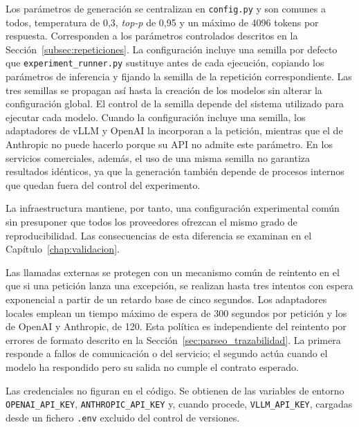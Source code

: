 Los parámetros de generación se centralizan en \texttt{config.py} y son comunes a todos, temperatura de 0,3, \textit{top-p} de 0,95 y un máximo de 4096 tokens por respuesta. Corresponden a los parámetros controlados descritos en la Sección~\ref{subsec:repeticiones}. La configuración incluye una semilla por defecto que \texttt{experiment\_runner.py} sustituye antes de cada ejecución, copiando los parámetros de inferencia y fijando la semilla de la repetición correspondiente. Las tres semillas se propagan así hasta la creación de los modelos sin alterar la configuración global. El control de la semilla depende del sistema utilizado para ejecutar cada modelo. Cuando la configuración incluye una semilla, los adaptadores de vLLM y OpenAI la incorporan a la petición, mientras que el de Anthropic no puede hacerlo porque su API no admite este parámetro. En los servicios comerciales, además, el uso de una misma semilla no garantiza resultados idénticos, ya que la generación también depende de procesos internos que quedan fuera del control del experimento.

La infraestructura mantiene, por tanto, una configuración experimental común sin presuponer que todos los proveedores ofrezcan el mismo grado de reproducibilidad. Las consecuencias de esta diferencia se examinan en el Capítulo~\ref{chap:validacion}.

Las llamadas externas se protegen con un mecanismo común de reintento en el que si una petición lanza una excepción, se realizan hasta tres intentos con espera exponencial a partir de un retardo base de cinco segundos. Los adaptadores locales emplean un tiempo máximo de espera de 300 segundos por petición y los de OpenAI y Anthropic, de 120. Esta política es independiente del reintento por errores de formato descrito en la Sección~\ref{sec:parseo_trazabilidad}. La primera responde a fallos de comunicación o del servicio; el segundo actúa cuando el modelo ha respondido pero su salida no cumple el contrato esperado.

Las credenciales no figuran en el código. Se obtienen de las variables de entorno \texttt{OPENAI\_API\_KEY}, \texttt{ANTHROPIC\_API\_KEY} y, cuando procede, \texttt{VLLM\_API\_KEY}, cargadas desde un fichero \texttt{.env} excluido del control de versiones.


